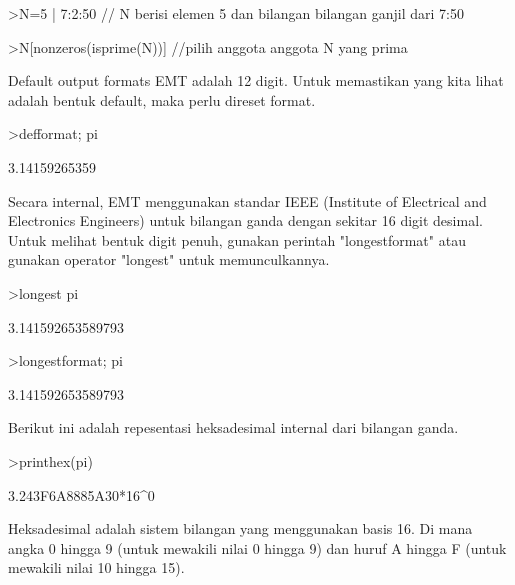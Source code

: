 \documentclass[a4paper,10pt]{article}
\begin{document}
\begin{eulernotebook}
\begin{eulercomment}
\begin{eulercomment}
\begin{eulercomment}
\end{eulercomment}
\begin{eulerprompt}
>N=5 | 7:2:50 // N berisi elemen 5 dan bilangan bilangan ganjil dari 7:50
\end{eulerprompt}
\begin{euleroutput}
  [5,  7,  9,  11,  13,  15,  17,  19,  21,  23,  25,  27,  29,  31,  33,
  35,  37,  39,  41,  43,  45,  47,  49]
\end{euleroutput}
\begin{eulerprompt}
>N[nonzeros(isprime(N))] //pilih anggota anggota N yang prima
\end{eulerprompt}
\begin{euleroutput}
  [5,  7,  11,  13,  17,  19,  23,  29,  31,  37,  41,  43,  47]
\end{euleroutput}
\begin{eulercomment}
Default output formats EMT adalah 12 digit. Untuk memastikan yang kita
lihat adalah bentuk default, maka perlu direset format.
\end{eulercomment}
\begin{eulerprompt}
>defformat; pi
\end{eulerprompt}
\begin{euleroutput}
  3.14159265359
\end{euleroutput}
\begin{eulercomment}
Secara internal, EMT menggunakan standar IEEE (Institute of Electrical
and Electronics Engineers) untuk bilangan ganda dengan sekitar 16
digit desimal. Untuk melihat bentuk digit penuh, gunakan perintah
"longestformat" atau gunakan operator "longest" untuk memunculkannya.
\end{eulercomment}
\begin{eulerprompt}
>longest pi
\end{eulerprompt}
\begin{euleroutput}
        3.141592653589793 
\end{euleroutput}
\begin{eulerprompt}
>longestformat; pi
\end{eulerprompt}
\begin{euleroutput}
  3.141592653589793
\end{euleroutput}
\begin{eulercomment}
Berikut ini adalah repesentasi heksadesimal internal dari bilangan
ganda.
\end{eulercomment}
\begin{eulerprompt}
>printhex(pi)
\end{eulerprompt}
\begin{euleroutput}
  3.243F6A8885A30*16^0
\end{euleroutput}
\begin{eulercomment}
Heksadesimal adalah sistem bilangan yang menggunakan basis 16. Di mana
angka 0 hingga 9 (untuk mewakili nilai 0 hingga 9) dan huruf A hingga
F (untuk mewakili nilai 10 hingga 15).


\end{eulercomment}
\end{eulercomment}
\end{eulercomment}
\end{eulernotebook}
\end{document}

